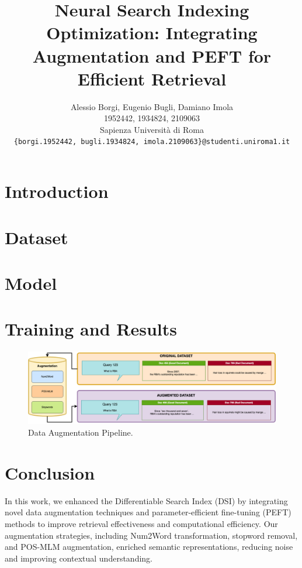 \documentclass{article}
\title{Neural Search Indexing Optimization: Integrating Augmentation and PEFT for Efficient Retrieval}
\author{
  Alessio Borgi, Eugenio Bugli, Damiano Imola \\
  1952442, 1934824, 2109063 \\
  Sapienza Università di Roma \\
  \texttt{\{borgi.1952442, bugli.1934824, imola.2109063\}@studenti.uniroma1.it} \\
}
\begin{document}
\maketitle

\begin{abstract}

\end{abstract}



\section{Introduction} 
\section{Dataset} 

\section{Model} 
\section{Training and Results} 

\begin{figure}
  \centering
  \includegraphics[width=\textwidth]{figs/dataset.png}
  \caption{Data Augmentation Pipeline.}
  \label{fig:fig1}
\end{figure}


\section{Conclusion}
In this work, we enhanced the Differentiable Search Index (DSI) by integrating novel data augmentation techniques and parameter-efficient fine-tuning (PEFT) methods to improve retrieval effectiveness and computational efficiency. Our augmentation strategies, including Num2Word transformation, stopword removal, and POS-MLM augmentation, enriched semantic representations, reducing noise and improving contextual understanding. 
\end{document}
